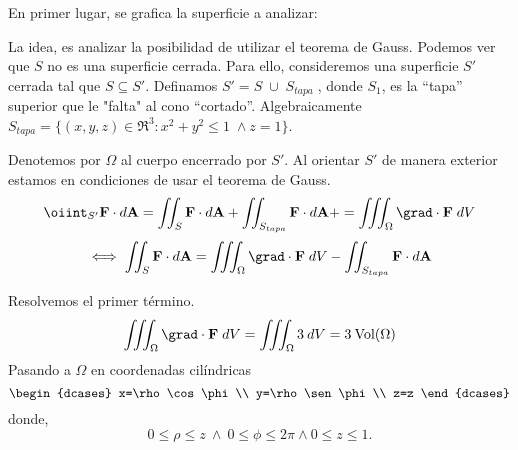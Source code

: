 \newpage
\begin{solution} 
En primer lugar, se grafica la superficie a analizar:


   \begin{center}
    \end{center}

  

    La idea, es analizar la posibilidad de utilizar el teorema de Gauss. Podemos ver que $S$ no es una superficie cerrada.   Para ello, consideremos una superficie $S'$  cerrada tal  que $S \subseteq S'.$  Definamos   $S'=S\;\cup\;S_{tapa}\;$,  donde $S_1$, es la ``tapa'' superior que le "falta" al cono ``cortado''.  Algebraicamente $S_{tapa}=\{(x,y,z)\in \Re^{3} : x^2+y^2\le 1\;\land z=1\}$.

    Denotemos por $\Omega$  al cuerpo encerrado por $S'$. Al orientar $S'$ de manera exterior estamos en condiciones de usar el teorema de Gauss.
   \[
        \oiint _{S'} \mathbf{F}\cdot d\mathbf{A} =
        \iint _{S} \mathbf{F}\cdot d\mathbf{A} +
        \iint _{S_{tapa}} \mathbf{F}\cdot d\mathbf{A} +
        =\iiint _\Omega \grad \cdot \mathbf{F}\;dV \newline
     \]
    \[ 
        \iff \iint _{S} \mathbf{F}\cdot d\mathbf{A} =
        \iiint _\Omega \grad \cdot \mathbf{F}\;dV -
        \iint _{S_{tapa}} \mathbf{F}\cdot d\mathbf{A} 
    \]
   

    Resolvemos el primer t\'ermino.
    \begin{align*}
        \iiint _\Omega \grad \cdot \mathbf{F}\;dV = \iiint _\Omega3\:dV = 3\:\text{Vol}(\Omega)
    \end{align*}
    Pasando a  $\Omega$ en coordenadas cil\'indricas
    \[\begin{dcases}
            x=\rho \cos \phi \\
            y=\rho \sen \phi \\
            z=z
        \end{dcases}\] donde, $$0\leq\rho\leq z\:\land\:0\leq\phi\leq 2\pi \land 0\leq z \leq 1.$$


\end{solution}
